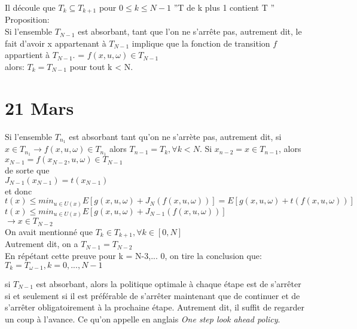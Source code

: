 \documentclass[oneside]{book}
\begin{document}
Il découle que $T_k \subseteq T_{k+1}$ pour $0 \leq k \leq N-1$ ''T de k plus 1 contient T ''\\

Proposition:\\

Si l'ensemble $T_{N-1}$ est absorbant, tant que l'on ne s'arrête pas, autrement dit, le fait d'avoir x appartenant à $T_{N-1}$ implique que la fonction de transition $f$ appartient à $T_{N-1}$.  = $f(x,u,\omega) \in T_{N-1}$\\

alors: $T_k = T_{N-1}$ pour tout k < N.

\chapter{21 Mars}
Si l'ensemble $T_{n_1}$ est absorbant tant qu'on ne s'arrète pas, autrement dit, si $x \in T_{n_1} \rightarrow f(x,u,\omega) \in T_{n_1}$ alors $T_{n-1} = T_k, \forall k<N$. Si $x_{n-2} = x \in T_{n-1}$, alors $x_{N-1} = f(x_{N-2}, u, \omega) \in T_{N-1}$ \\
de sorte que \\
$J_{N-1}(x_{N-1})  = t(x_{N-1})$ \\
et donc \\
$t(x) \leq min_{u \in U(x)}E[g(x,u,\omega) + J_N(f(x,u,\omega))] = E[g(x,u,\omega) + t(f(x,u,\omega))]$\\

$t(x) \leq min_{u \in U(x)} E[g(x,u,\omega) + J_{N-1}(f(x,u,\omega))]$\\

$\rightarrow x \in T_{N-2}$\\

On avait mentionné que $T_k \in T_{k+1}, \forall k \in [0,N]$\\

Autrement dit, on a $T_{N-1} = T_{N-2}$\\

En répétant cette preuve pour k = N-3,... 0, on tire la conclusion que:\\

$T_k = T_{\omega -1}, k=0,...,N-1$

si $T_{N-1}$ est absorbant, alors la politique optimale à chaque étape est de s'arrêter si et seulement si il est préférable de s'arrêter maintenant que de continuer et de s'arrêter obligatoirement à la prochaine étape. Autrement dit, il suffit de regarder un coup à l'avance. Ce qu'on appelle en anglais \textit{One step look ahead policy}.
\end{document}
